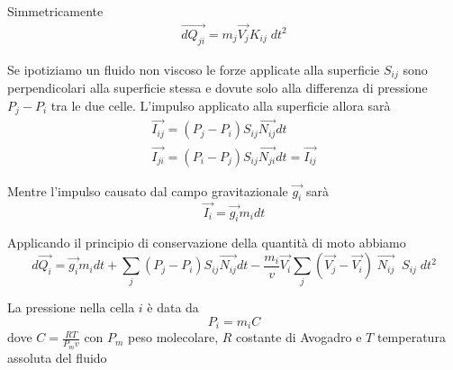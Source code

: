 \documentclass[a4paper,11pt]{article}
\begin{document}
Simmetricamente
\begin{eqnarray}
  \vec{dQ_{ji}} = m_j \vec{V_j} K_{ij} \; dt^2  
\end{eqnarray}

Se ipotiziamo un fluido non viscoso le forze applicate alla superficie $ S_{ij} $ sono perpendicolari alla superficie stessa
e dovute solo alla differenza di pressione $ P_j - P_i $ tra le due celle. L'impulso applicato alla superficie allora sarà
\begin{eqnarray}
  \vec{I_{ij}} = (P_{j} - P_{i} ) S_{ij} \vec{N_{ij}} dt 
  \\
  \vec{I_{ji}} = (P_{i} - P_{j} ) S_{ij} \vec{N_{ji}} dt = \vec{I_{ij}}
\end{eqnarray}


Mentre l'impulso causato dal campo gravitazionale $ \vec{g_i} $ sarà
\begin{equation}
  \vec{I_i} = \vec{g_i} m_i dt
\end{equation}

Applicando il principio di conservazione della quantità di moto abbiamo
\begin{equation}
   d \vec{Q_i} = \vec{g_i} m_i dt + \sum_j (P_{j} - P_{i} ) S_{ij} \vec{N_{ij}} dt
   -  \frac{m_i}{v} \vec{V_i} \sum_j \left( \vec{V_j} - \vec{V_i}\right) \; \vec{N_{ij}} \;  \; S_{ij} \; dt^2
\end{equation}

La pressione nella cella $ i $ è data da
\begin{equation}
  P_i = m_i C
\end{equation}
dove $ C = \frac{R T}{P_m v} $ con $ P_m $ peso molecolare, $ R $ costante di Avogadro e $ T $ temperatura assoluta del fluido
\end{document}
